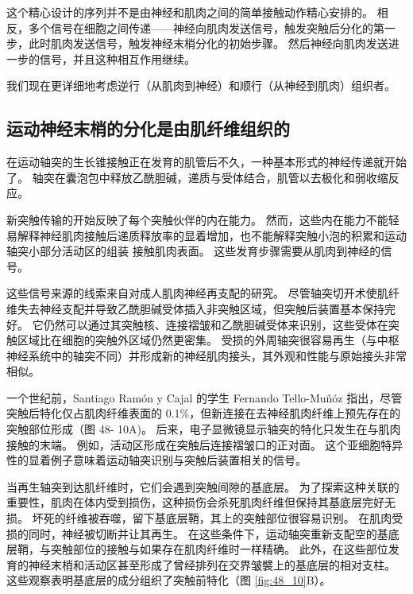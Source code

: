 这个精心设计的序列并不是由神经和肌肉之间的简单接触动作精心安排的。 
相反，多个信号在细胞之间传递——神经向肌肉发送信号，触发突触后分化的第一步，此时肌肉发送信号，触发神经末梢分化的初始步骤。
然后神经向肌肉发送进一步的信号，并且这种相互作用继续。


我们现在更详细地考虑逆行（从肌肉到神经）和顺行（从神经到肌肉）组织者。



\subsection{运动神经末梢的分化是由肌纤维组织的}

在运动轴突的生长锥接触正在发育的肌管后不久，一种基本形式的神经传递就开始了。
轴突在囊泡包中释放乙酰胆碱，递质与受体结合，肌管以去极化和弱收缩反应。


新突触传输的开始反映了每个突触伙伴的内在能力。
然而，这些内在能力不能轻易解释神经肌肉接触后递质释放率的显着增加，也不能解释突触小泡的积累和运动轴突小部分活动区的组装 接触肌肉表面。
这些发育步骤需要从肌肉到神经的信号。


这些信号来源的线索来自对成人肌肉神经再支配的研究。
尽管轴突切开术使肌纤维失去神经支配并导致乙酰胆碱受体插入非突触区域，但突触后装置基本保持完好。
它仍然可以通过其突触核、连接褶皱和乙酰胆碱受体来识别，这些受体在突触区域比在细胞的突触外区域仍然更密集。
受损的外周轴突很容易再生（与中枢神经系统中的轴突不同）并形成新的神经肌肉接头，其外观和性能与原始接头非常相似。


一个世纪前，Santiago Ramón y Cajal 的学生 Fernando Tello-Muñóz 指出，尽管突触后特化仅占肌肉纤维表面的 0.1\%，但新连接在去神经肌肉纤维上预先存在的突触部位形成（图 48- 10A)。
后来，电子显微镜显示轴突的特化只发生在与肌肉接触的末端。 例如，活动区形成在突触后连接褶皱口的正对面。
这个亚细胞特异性的显着例子意味着运动轴突识别与突触后装置相关的信号。


当再生轴突到达肌纤维时，它们会遇到突触间隙的基底层。
为了探索这种关联的重要性，肌肉在体内受到损伤，这种损伤会杀死肌肉纤维但保持其基底层完好无损。
坏死的纤维被吞噬，留下基底层鞘，其上的突触部位很容易识别。
在肌肉受损的同时，神经被切断并让其再生。
在这些条件下，运动轴突重新支配空的基底层鞘，与突触部位的接触与如果存在肌肉纤维时一样精确。
此外，在这些部位发育的神经末梢和活动区甚至形成了曾经排列在交界皱襞上的基底层的相对支柱。
这些观察表明基底层的成分组织了突触前特化（图 \ref{fig:48_10}B）。


